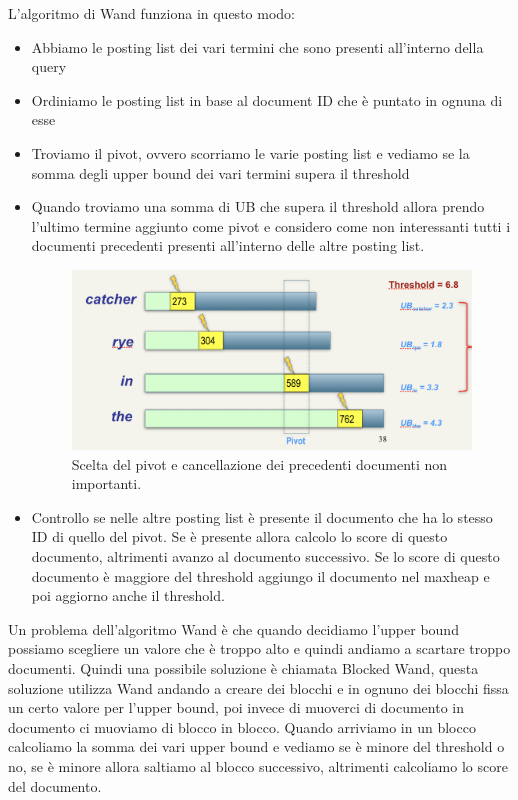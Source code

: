 \documentclass[14pt]{extreport}
\begin{document}
L'algoritmo di Wand funziona in questo modo:
\begin{itemize}
    \item Abbiamo le posting list dei vari termini che sono presenti all'interno della query
    \item Ordiniamo le posting list in base al document ID che è puntato in ognuna di esse
    \item Troviamo il pivot, ovvero scorriamo le varie posting list e vediamo se la somma degli upper bound dei vari termini supera il threshold
    \item Quando troviamo una somma di UB che supera il threshold allora prendo l'ultimo termine aggiunto come pivot e considero come non interessanti tutti i documenti precedenti presenti all'interno delle altre posting list.
    
\begin{figure}[h!]
  \includegraphics[width=\linewidth]{Wand.png}
  \caption{Scelta del pivot e cancellazione dei precedenti documenti non importanti.}
\end{figure}

    \item Controllo se nelle altre posting list è presente il documento che ha lo stesso ID di quello del pivot. Se è presente allora calcolo lo score di questo documento, altrimenti avanzo al documento successivo. Se lo score di questo documento è maggiore del threshold aggiungo il documento nel maxheap e poi aggiorno anche il threshold.
\end{itemize}

Un problema dell'algoritmo Wand è che quando decidiamo l'upper bound possiamo scegliere un valore che è troppo alto e quindi andiamo a scartare troppo documenti.
Quindi una possibile soluzione è chiamata Blocked Wand, questa soluzione utilizza Wand andando a creare dei blocchi e in ognuno dei blocchi fissa un certo valore per l'upper bound, poi invece di muoverci di documento in documento ci muoviamo di blocco in blocco.
Quando arriviamo in un blocco calcoliamo la somma dei vari upper bound e vediamo se è minore del threshold o no, se è minore allora saltiamo al blocco successivo, altrimenti calcoliamo lo score del documento.
\end{document}
